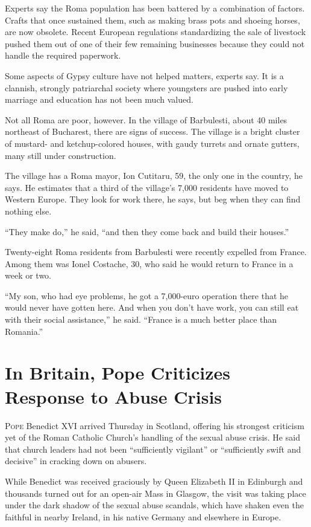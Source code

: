 ﻿\documentclass[12pt]{article}
\begin{document}
Experts say the Roma population has been battered by a combination of factors. Crafts that once
sustained them, such as making brass pots and shoeing horses, are now obsolete. Recent European
regulations standardizing the sale of livestock pushed them out of one of their few remaining
businesses because they could not handle the required paperwork.

Some aspects of Gypsy culture have not helped matters, experts say. It is a clannish, strongly
patriarchal society where youngsters are pushed into early marriage and education has not been much
valued.

Not all Roma are poor, however. In the village of Barbulesti, about 40 miles northeast of Bucharest,
there are signs of success. The village is a bright cluster of mustard- and ketchup-colored houses,
with gaudy turrets and ornate gutters, many still under construction.

The village has a Roma mayor, Ion Cutitaru, 59, the only one in the country, he says. He estimates
that a third of the village's 7,000 residents have moved to Western Europe. They look for work
there, he says, but beg when they can find nothing else.

``They make do,'' he said, ``and then they come back and build their houses.''

Twenty-eight Roma residents from Barbulesti were recently expelled from France. Among them was Ionel
Costache, 30, who said he would return to France in a week or two.

``My son, who had eye problems, he got a 7,000-euro operation there that he would never have gotten
here. And when you don't have work, you can still eat with their social assistance,'' he said.
``France is a much better place than Romania.''

\pagebreak
\section{In Britain, Pope Criticizes Response to Abuse Crisis}

\lettrine{P}{ope} Benedict XVI arrived Thursday in Scotland, offering his
strongest criticism yet of the Roman Catholic Church's handling of the sexual abuse crisis. He said
that church leaders had not been ``sufficiently vigilant'' or ``sufficiently swift and decisive'' in
cracking down on abusers.

While Benedict was received graciously by Queen Elizabeth II in Edinburgh and thousands turned out
for an open-air Mass in Glasgow, the visit was taking place under the dark shadow of the sexual
abuse scandals, which have shaken even the faithful in nearby Ireland, in his native Germany and
elsewhere in Europe.
\end{document}

